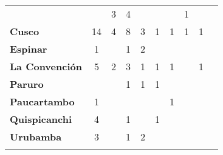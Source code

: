 \begin{tabular}{lccccccccc}
	&\cellcolor[HTML]{FCC46C}					&3
	&4											&\cellcolor[HTML]{FCC46C}
	&\cellcolor[HTML]{FCC46C}					&\cellcolor[HTML]{FCC46C}
	&1											&\cellcolor[HTML]{FCC46C}
	&\cellcolor[HTML]{FCC46C}\\
	\textbf{Cusco}                            											
	&14 										&4
	&8											&3
	&1											&1
	&1											&1
	&\cellcolor[HTML]{FCC46C}\\
	\textbf{Espinar}       					             								&1
	&\cellcolor[HTML]{FCC46C}					&1
	&2											&\cellcolor[HTML]{FCC46C}	
	&\cellcolor[HTML]{FCC46C} 					&\cellcolor[HTML]{FCC46C}
	&\cellcolor[HTML]{FCC46C}					&\cellcolor[HTML]{FCC46C}\\
	\textbf{La Convención}                      					
	&5
	&2											&3
	&1 											&1 
	&1											&\cellcolor[HTML]{FCC46C}
	&1											&\cellcolor[HTML]{FCC46C}\\
	\textbf{Paruro}                            					
	&\cellcolor[HTML]{FCC46C}
	&\cellcolor[HTML]{FCC46C} 					&1
	&1											&1
	&\cellcolor[HTML]{FCC46C}					&\cellcolor[HTML]{FCC46C}
	&\cellcolor[HTML]{FCC46C}					&\cellcolor[HTML]{FCC46C}\\
	\textbf{Paucartambo}               		                       						
	&1											&\cellcolor[HTML]{FCC46C}
	&\cellcolor[HTML]{FCC46C}
	&\cellcolor[HTML]{FCC46C}					&\cellcolor[HTML]{FCC46C}
	&1											&\cellcolor[HTML]{FCC46C}
	&\cellcolor[HTML]{FCC46C}					&\cellcolor[HTML]{FCC46C}\\
	\textbf{Quispicanchi}                                         	                 	
	&4											&\cellcolor[HTML]{FCC46C}
	&1											&\cellcolor[HTML]{FCC46C}
	&1											&\cellcolor[HTML]{FCC46C}
	&\cellcolor[HTML]{FCC46C}					&\cellcolor[HTML]{FCC46C}
	&\cellcolor[HTML]{FCC46C}\\
	\textbf{Urubamba}                                                          			
	&3
	&\cellcolor[HTML]{FCC46C}					&1
	&2											&\cellcolor[HTML]{FCC46C}
	&\cellcolor[HTML]{FCC46C}					&\cellcolor[HTML]{FCC46C}
	&\cellcolor[HTML]{FCC46C} 					&\cellcolor[HTML]{FCC46C}\\	
	&\multicolumn{1}{l}{}                       &\multicolumn{1}{l}{}            &\multicolumn{1}{l}{}                         
	&\multicolumn{1}{l}{}                       &\multicolumn{1}{l}{}            &\multicolumn{1}{l}{}                       &\multicolumn{1}{l}{}                       &\multicolumn{1}{l}{}            &\multicolumn{1}{l}{}    
\end{tabular}
